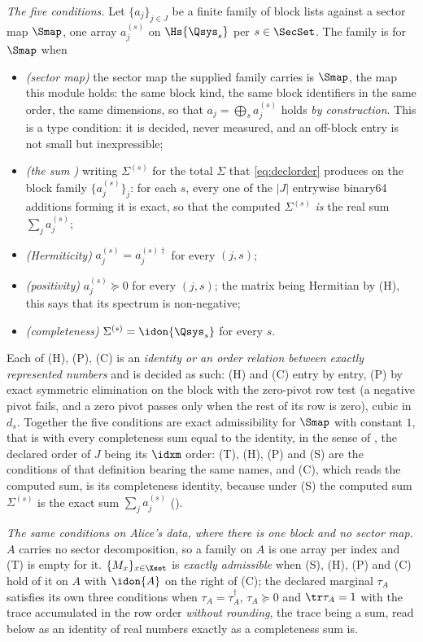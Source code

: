 \begin{definition}
\emph{The five conditions.} Let $\{a_j\}_{j\in J}$ be a finite family of
block lists against a sector map $\Smap$, one array $a_j^{(s)}$ on
$\Hs{\Qsys_s}$ per $s\in\SecSet$. The family is 
for $\Smap$ when
\begin{itemize}[leftmargin=2.6em]
\item[(T)] \emph{(sector map)} the sector map the supplied family carries is
  $\Smap$, the map this module holds: the same block kind, the same block
  identifiers in the same order, the same dimensions, so that
  $a_j=\bigoplus_sa_j^{(s)}$ holds \emph{by construction}. This is a type
  condition: it is decided, never measured, and an off-block entry is not
  small but inexpressible;
\item[(S)] \emph{(the sum )} writing $\Sigma^{(s)}$ for
  the total $\Sigma$ that \eqref{eq:declorder} produces on the block family
  $\{a_j^{(s)}\}_j$: for each $s$, every one of the $|J|$ entrywise binary64
  additions forming it is exact, so that the computed $\Sigma^{(s)}$ \emph{is}
  the real sum $\sum_ja_j^{(s)}$;
\item[(H)] \emph{(Hermiticity)} $a_j^{(s)}=a_j^{(s)\dagger}$ for every $(j,s)$;
\item[(P)] \emph{(positivity)} $a_j^{(s)}\succeq0$ for every $(j,s)$; the
  matrix being Hermitian by (H), this says that its spectrum is non-negative;
\item[(C)] \emph{(completeness)} $\Sigma^{(s)}=\idon{\Qsys_s}$ for every $s$.
\end{itemize}
Each of (H), (P), (C) is an \emph{identity or an order relation between
exactly represented numbers} and is decided as such: (H) and (C) entry by
entry, (P) by exact symmetric elimination on the block with the zero-pivot
row test (a negative pivot fails, and a zero pivot passes only when the rest
of its row is zero), cubic in $d_s$. Together the five conditions are exact
admissibility for $\Smap$ with constant $1$, that is with every completeness
sum equal to the identity, in the sense of
, the declared order of $J$ being
its $\idxm$ order: (T), (H), (P) and (S) are the conditions of that
definition bearing the same names, and (C), which reads the computed sum, is
its completeness identity, because under (S) the computed sum $\Sigma^{(s)}$
is the exact sum $\sum_ja_j^{(s)}$
().

\emph{The same conditions on Alice's data, where there is one block and no
sector map.} $A$ carries no sector decomposition, so a family on $A$ is one
array per index and (T) is empty for it. $\{M_x\}_{x\in\Xset}$ is
\emph{exactly admissible} when (S), (H), (P) and (C) hold of it on $A$ with
$\idon{A}$ on the right of (C); the declared marginal $\tau_A$ satisfies its
own three conditions when $\tau_A=\tau_A^{\dagger}$, $\tau_A\succeq0$ and
$\tr\tau_A=1$ with the trace accumulated in the row order \emph{without
rounding}, the trace being a sum, read below as an identity of real numbers
exactly as a completeness sum is.


\end{definition}

